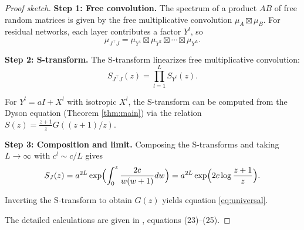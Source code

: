 \begin{proof}[Proof sketch]
\textbf{Step 1: Free convolution.} The spectrum of a product $AB$ of free random matrices is given by the free multiplicative convolution $\mu_A \boxtimes \mu_B$. For residual networks, each layer contributes a factor $Y^l$, so
\[
\mu_{J^\top J} = \mu_{Y^1} \boxtimes \mu_{Y^2} \boxtimes \cdots \boxtimes \mu_{Y^L}.
\]

\textbf{Step 2: S-transform.} The S-transform linearizes free multiplicative convolution:
\[
S_{J^\top J}(z) = \prod_{l=1}^L S_{Y^l}(z).
\]

For $Y^l = aI + X^l$ with isotropic $X^l$, the S-transform can be computed from the Dyson equation (Theorem \ref{thm:main}) via the relation $S(z) = \frac{z+1}{z} G((z+1)/z)$.

\textbf{Step 3: Composition and limit.} Composing the S-transforms and taking $L \to \infty$ with $c^l \sim c/L$ gives
\[
S_J(z) = a^{2L} \exp\Bigl(\int_0^z \frac{2c}{w(w+1)} dw\Bigr) = a^{2L} \exp\Bigl(2c\log\frac{z+1}{z}\Bigr).
\]

Inverting the S-transform to obtain $G(z)$ yields equation \eqref{eq:universal}.

The detailed calculations are given in \cite{tarnowski2019dynamical}, equations (23)--(25).
\end{proof}
